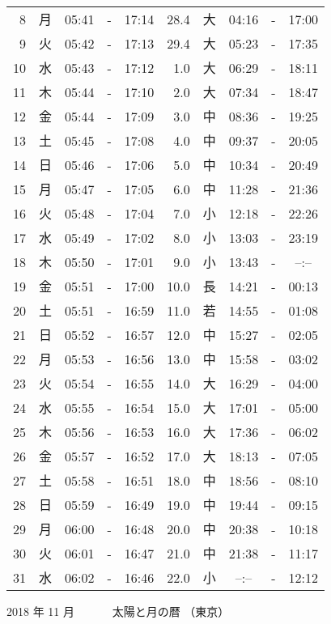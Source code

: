 \documentclass[a4j,10pt]{jsarticle}
\begin{document}
\begin{center}
\begin{table}[ht]
\begin{center}
\begin{tabular}{|rc|ccc|rc|ccc|}
  8 & 月 & 05:41 &-& 17:14 & 28.4 & 大 & 04:16 &-& 17:00 \\
  9 & 火 & 05:42 &-& 17:13 & 29.4 & 大 & 05:23 &-& 17:35 \\
 10 & 水 & 05:43 &-& 17:12 &  1.0 & 大 & 06:29 &-& 18:11 \\
 11 & 木 & 05:44 &-& 17:10 &  2.0 & 大 & 07:34 &-& 18:47 \\
 12 & 金 & 05:44 &-& 17:09 &  3.0 & 中 & 08:36 &-& 19:25 \\
 13 & 土 & 05:45 &-& 17:08 &  4.0 & 中 & 09:37 &-& 20:05 \\
 14 & 日 & 05:46 &-& 17:06 &  5.0 & 中 & 10:34 &-& 20:49 \\
 15 & 月 & 05:47 &-& 17:05 &  6.0 & 中 & 11:28 &-& 21:36 \\
 16 & 火 & 05:48 &-& 17:04 &  7.0 & 小 & 12:18 &-& 22:26 \\
 17 & 水 & 05:49 &-& 17:02 &  8.0 & 小 & 13:03 &-& 23:19 \\
 18 & 木 & 05:50 &-& 17:01 &  9.0 & 小 & 13:43 &-& --:-- \\
 19 & 金 & 05:51 &-& 17:00 & 10.0 & 長 & 14:21 &-& 00:13 \\
 20 & 土 & 05:51 &-& 16:59 & 11.0 & 若 & 14:55 &-& 01:08 \\
 21 & 日 & 05:52 &-& 16:57 & 12.0 & 中 & 15:27 &-& 02:05 \\
 22 & 月 & 05:53 &-& 16:56 & 13.0 & 中 & 15:58 &-& 03:02 \\
 23 & 火 & 05:54 &-& 16:55 & 14.0 & 大 & 16:29 &-& 04:00 \\
 24 & 水 & 05:55 &-& 16:54 & 15.0 & 大 & 17:01 &-& 05:00 \\
 25 & 木 & 05:56 &-& 16:53 & 16.0 & 大 & 17:36 &-& 06:02 \\
 26 & 金 & 05:57 &-& 16:52 & 17.0 & 大 & 18:13 &-& 07:05 \\
 27 & 土 & 05:58 &-& 16:51 & 18.0 & 中 & 18:56 &-& 08:10 \\
 28 & 日 & 05:59 &-& 16:49 & 19.0 & 中 & 19:44 &-& 09:15 \\
 29 & 月 & 06:00 &-& 16:48 & 20.0 & 中 & 20:38 &-& 10:18 \\
 30 & 火 & 06:01 &-& 16:47 & 21.0 & 中 & 21:38 &-& 11:17 \\
 31 & 水 & 06:02 &-& 16:46 & 22.0 & 小 & --:-- &-& 12:12 \\
\hline
\end{tabular}
\end{center}
\end{table}
\newpage
{\large 2018 年 11 月}
{\Large 　　　太陽と月の暦   （東京） }

\end{center}
\end{document}
